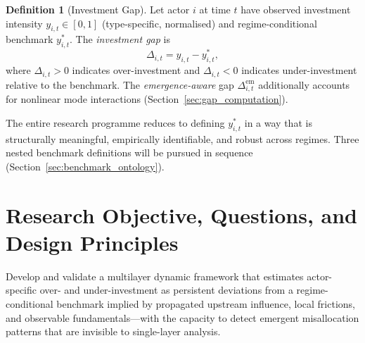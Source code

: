 \documentclass[11pt,a4paper]{article}
\theoremstyle{definition}
\newtheorem{definition}{Definition}[section]
\begin{document}
\begin{definition}[Investment Gap]
\label{def:gap}
Let actor $i$ at time $t$ have observed investment intensity $y_{i,t} \in [0,1]$ (type-specific, normalised) and regime-conditional benchmark $y^*_{i,t}$. The \emph{investment gap} is
\begin{equation}
  \Delta_{i,t} = y_{i,t} - y^*_{i,t},
  \label{eq:gap}
\end{equation}
where $\Delta_{i,t} > 0$ indicates over-investment and $\Delta_{i,t} < 0$ indicates under-investment relative to the benchmark. The \emph{emergence-aware} gap $\Delta_{i,t}^{\mathrm{em}}$ additionally accounts for nonlinear mode interactions (Section~\ref{sec:gap_computation}).
\end{definition}

The entire research programme reduces to defining $y^*_{i,t}$ in a way that is structurally meaningful, empirically identifiable, and robust across regimes. Three nested benchmark definitions will be pursued in sequence (Section~\ref{sec:benchmark_ontology}).


\section{Research Objective, Questions, and Design Principles}
\label{sec:objectives}

\begin{greenbox}
Develop and validate a multilayer dynamic framework that estimates actor-specific over- and under-investment as persistent deviations from a regime-conditional benchmark implied by propagated upstream influence, local frictions, and observable fundamentals---with the capacity to detect emergent misallocation patterns that are invisible to single-layer analysis.
\end{greenbox}
\end{document}
